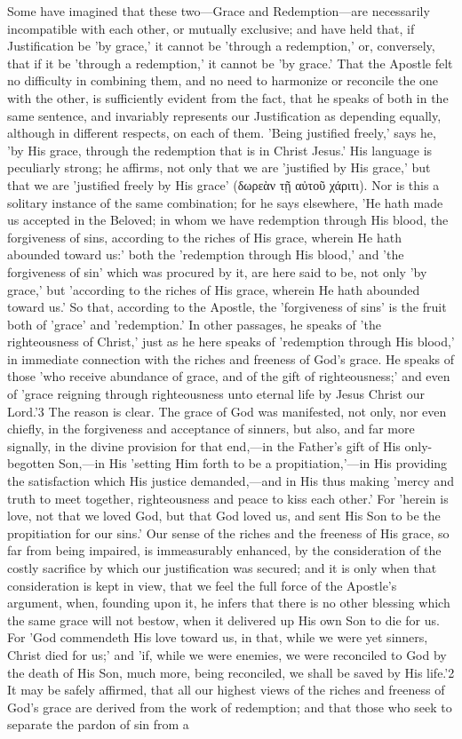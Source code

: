 \documentclass[
]{book}
\begin{document}
Some have imagined that these two---Grace and Redemption---are necessarily incompatible with each other, or mutually exclusive; and have held that, if Justification be 'by grace,' it cannot be 'through a redemption,' or, conversely, that if it be 'through a redemption,' it cannot be 'by grace.' That the Apostle felt no difficulty in combining them, and no need to harmonize or reconcile the one with the other, is sufficiently evident from the fact, that he speaks of both in the same sentence, and invariably represents our Justification as depending equally, although in different respects, on each of them. 'Being justified freely,' says he, 'by His grace, through the redemption that is in Christ Jesus.' His language is peculiarly strong; he affirms, not only that we are 'justified by His grace,' but that we are 'justified freely by His grace' (δωρεὰν τῇ αὐτοῦ χάριτι). Nor is this a solitary instance of the same combination; for he says elsewhere, 'He hath made us accepted in the Beloved; in whom we have redemption through His blood, the forgiveness of sins, according to the riches of His grace, wherein He hath abounded toward us:' both the 'redemption through His blood,' and 'the forgiveness of sin' which was procured by it, are here said to be, not only 'by grace,' but 'according to the riches of His grace, wherein He hath abounded toward us.' So that, according to the Apostle, the 'forgiveness of sins' is the fruit both of 'grace' and 'redemption.' In other passages, he speaks of 'the righteousness of Christ,' just as he here speaks of 'redemption through His blood,' in immediate connection with the riches and freeness of God's grace. He speaks of those 'who receive abundance of grace, and of the gift of righteousness;' and even of 'grace reigning through righteousness unto eternal life by Jesus Christ our Lord.'3 The reason is clear. The grace of God was manifested, not only, nor even chiefly, in the forgiveness and acceptance of sinners, but also, and far more signally, in the divine provision for that end,---in the Father's gift of His only-begotten Son,---in His 'setting Him forth to be a propitiation,'---in His providing the satisfaction which His justice demanded,---and in His thus making 'mercy and truth to meet together, righteousness and peace to kiss each other.' For 'herein is love, not that we loved God, but that God loved us, and sent His Son to be the propitiation for our sins.' Our sense of the riches and the freeness of His grace, so far from being impaired, is immeasurably enhanced, by the consideration of the costly sacrifice by which our justification was secured; and it is only when that consideration is kept in view, that we feel the full force of the Apostle's argument, when, founding upon it, he infers that there is no other blessing which the same grace will not bestow, when it delivered up His own Son to die for us. For 'God commendeth His love toward us, in that, while we were yet sinners, Christ died for us;' and 'if, while we were enemies, we were reconciled to God by the death of His Son, much more, being reconciled, we shall be saved by His life.'2 It may be safely affirmed, that all our highest views of the riches and freeness of God's grace are derived from the work of redemption; and that those who seek to separate the pardon of sin from a 
\end{document}

